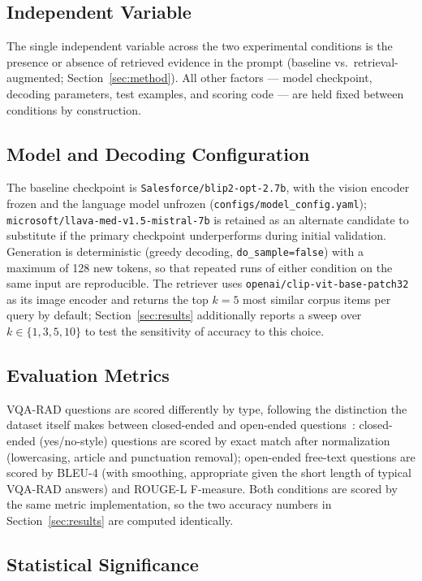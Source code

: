 \subsection{Independent Variable}

The single independent variable across the two experimental conditions is
the presence or absence of retrieved evidence in the prompt (baseline vs.\
retrieval-augmented; Section~\ref{sec:method}). All other factors --- model
checkpoint, decoding parameters, test examples, and scoring code --- are
held fixed between conditions by construction.

\subsection{Model and Decoding Configuration}

The baseline checkpoint is \texttt{Salesforce/blip2-opt-2.7b}, with the
vision encoder frozen and the language model unfrozen
(\texttt{configs/model\_config.yaml}); \texttt{microsoft/llava-med-v1.5-mistral-7b}
is retained as an alternate candidate to substitute if the primary
checkpoint underperforms during initial validation. Generation is
deterministic (greedy decoding, \texttt{do\_sample=false}) with a maximum of
128 new tokens, so that repeated runs of either condition on the same input
are reproducible. The retriever uses \texttt{openai/clip-vit-base-patch32}
as its image encoder and returns the top $k{=}5$ most similar corpus items
per query by default; Section~\ref{sec:results} additionally reports a
sweep over $k \in \{1, 3, 5, 10\}$ to test the sensitivity of accuracy to
this choice.

\subsection{Evaluation Metrics}

VQA-RAD questions are scored differently by type, following the
distinction the dataset itself makes between closed-ended and open-ended
questions~\cite{lau2018vqarad}: closed-ended (yes/no-style) questions are
scored by exact match after normalization (lowercasing, article and
punctuation removal); open-ended free-text questions are scored by BLEU-4
(with smoothing, appropriate given the short length of typical VQA-RAD
answers) and ROUGE-L F-measure. Both conditions are scored by the same
metric implementation, so the two accuracy numbers in
Section~\ref{sec:results} are computed identically.

\subsection{Statistical Significance}

